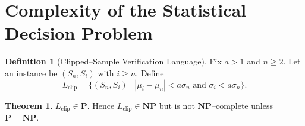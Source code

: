 \documentclass[12pt]{article}
\theoremstyle{definition}
\newtheorem{definition}{Definition}[section]
\newtheorem{theorem}{Theorem}[section]
\begin{document}
\section{Complexity of the Statistical Decision Problem}
\begin{definition}[Clipped--Sample Verification Language]
Fix $a>1$ and $n\ge 2$.  Let an instance be $(S_n,S_i)$ with $i\ge n$.  Define
\[
  L_{\mathrm{clip}} = \bigl\{(S_n,S_i)\mid |\mu_i-\mu_n|<a\sigma_n \text{ and } \sigma_i < a\sigma_n\bigr\}.
\]
\end{definition}

\begin{theorem}
$L_{\mathrm{clip}} \in \mathbf{P}$.  Hence $L_{\mathrm{clip}} \in \mathbf{NP}$ but is not $\mathbf{NP}$--complete unless $\mathbf{P} = \mathbf{NP}$.
\end{theorem}
\end{document}

